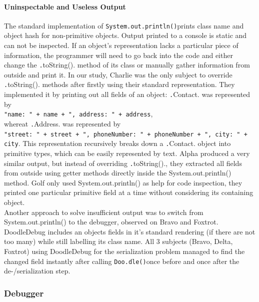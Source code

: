 \documentclass[english]{acm_proc_article-sp}
\begin{document}
\paragraph{Uninspectable and Useless Output}
The standard implementation of \texttt{System.out.println()}prints class name and object hash for non-primitive objects. 
Output printed to a console is static and can not be inspected. 
If an object's representation lacks a particular piece of information, the programmer will need to go back into the code and either change the \texttt.toString(). 
method of its class or manually gather information from outside and print it. 
In our study, Charlie was the only subject to override \texttt.toString(). 
methods after firstly using their standard representation. 
They implemented it by printing out all fields of an object: \texttt.Contact. 
was represented by\\
\texttt{"name: " + name + ", address: " + address},\\
whereat \texttt.Address. 
was represented by\\
\texttt{"street: " + street + ", phoneNumber: " + phoneNumber + ", city: " + city}.
This representation recursively breaks down a \texttt.Contact. 
object into primitive types, which can be easily represented by text. 
Alpha produced a very similar output, but instead of overriding \texttt.toString()., they extracted all fields from outside using getter methods directly inside the System.out.println() method. 
Golf only used System.out.println() as help for code inspection, they printed one particular primitive field at a time without considering its containing object.\\
Another approach to solve insufficient output was to switch from System.out.println() to the debugger, observed on Bravo and Foxtrot.\\
DoodleDebug includes an objects fields in it's standard rendering (if there are not too many) while still labelling its class name. 
All 3 subjects (Bravo, Delta, Foxtrot) using DoodleDebug for the serialization problem managed to find the changed field instantly after calling \texttt{Doo.dle()}once before and once after the de-/serialization step.

\subsubsection{Debugger}
\end{document}
